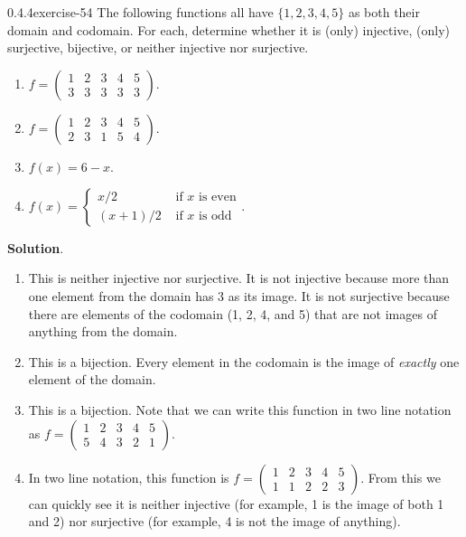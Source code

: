 \documentclass[twoside,11pt,]{book}
\numberwithin{equation}{chapter}
\newcommand{\twoline}[2]{\begin{pmatrix}#1 \\ #2 \end{pmatrix}}
\newcommand{\amp}{&}
\begin{document}
\begin{divisionsolution}{0.4.4}{}{exercise-54}%
\hypertarget{p-949}{}%
The following functions all have \(\{1,2,3,4,5\}\) as both their domain and codomain. For each, determine whether it is (only) injective, (only) surjective, bijective, or neither injective nor surjective.\leavevmode%
\begin{enumerate}[label=(\alph*)]
\item\hypertarget{li-757}{}\hypertarget{p-950}{}%
\(f = \twoline{1 \amp 2 \amp 3 \amp 4 \amp 5}{3 \amp 3 \amp 3 \amp 3 \amp 3}\text{.}\) %
\item\hypertarget{li-763}{}\hypertarget{p-951}{}%
\(f = \twoline{1 \amp 2 \amp 3 \amp 4 \amp 5}{2 \amp 3 \amp 1 \amp 5 \amp 4}\text{.}\) %
\item\hypertarget{li-769}{}\hypertarget{p-952}{}%
\(f(x) = 6 - x\text{.}\) %
\item\hypertarget{li-775}{}\hypertarget{p-953}{}%
\(f(x) = \begin{cases} x/2 \amp \text{ if } x \text{ is even} \\ (x+1)/2 \amp \text{ if } x \text{ is odd}\end{cases}\text{.}\) %
\end{enumerate}
%
\par\smallskip%
\noindent\textbf{Solution}.\quad%
\hypertarget{p-954}{}%
\leavevmode%
\begin{enumerate}[label=(\alph*)]
\item\hypertarget{li-781}{}\hypertarget{p-955}{}%
This is neither injective nor surjective. It is not injective because more than one element from the domain has 3 as its image. It is not surjective because there are elements of the codomain (1, 2, 4, and 5) that are not images of anything from the domain.%
\item\hypertarget{li-782}{}\hypertarget{p-956}{}%
This is a bijection. Every element in the codomain is the image of \emph{exactly} one element of the domain.%
\item\hypertarget{li-783}{}\hypertarget{p-957}{}%
This is a bijection. Note that we can write this function in two line notation as \(f = \twoline{1 \amp 2 \amp 3 \amp 4 \amp 5}{5 \amp 4 \amp 3 \amp 2 \amp 1}\text{.}\)%
\item\hypertarget{li-784}{}\hypertarget{p-958}{}%
In two line notation, this function is \(f = \twoline{1 \amp 2 \amp 3 \amp 4 \amp 5}{1 \amp 1 \amp 2 \amp 2 \amp 3}\text{.}\) From this we can quickly see it is neither injective (for example, 1 is the image of both 1 and 2) nor surjective (for example, 4 is not the image of anything).%
\end{enumerate}
%
\end{divisionsolution}%
\end{document}
